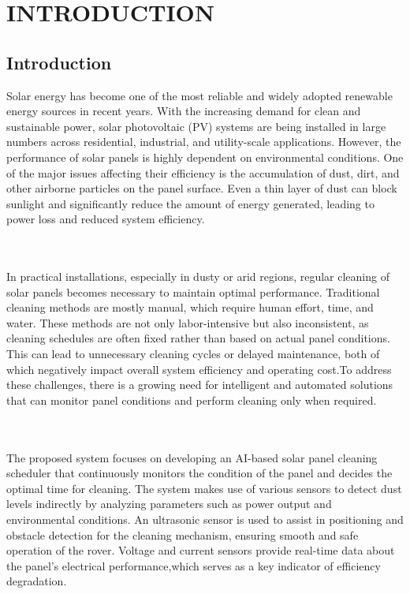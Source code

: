 \documentclass[10pt]{report}
\begin{document}
\begin{sloppypar}
{{{\begin{sloppypar}
\chapter{INTRODUCTION}
\section{Introduction}
\hspace{0.5cm} 
Solar energy has become one of the most reliable and widely adopted renewable energy sources in recent years. With the increasing demand for clean and sustainable power, solar photovoltaic (PV) systems are being installed in large numbers across
residential, industrial, and utility-scale applications. However, the performance of solar panels is highly dependent on environmental conditions. One of the major issues affecting their efficiency is the accumulation of dust, dirt, and other airborne particles on the panel surface. Even a thin layer of dust can block sunlight and significantly reduce the amount of energy generated, leading to power loss and reduced
system efficiency.

\\
\\
\hspace{0.5cm}
In practical installations, especially in dusty or arid regions, regular cleaning of solar panels becomes necessary to maintain optimal performance. Traditional cleaning methods are mostly manual, which require human effort, time, and water. These methods are not only labor-intensive but also inconsistent, as cleaning schedules are often fixed rather than based on actual panel conditions. This can lead to unnecessary cleaning cycles or delayed maintenance, both of which negatively impact overall
system efficiency and operating cost.To address these challenges, there is a growing need for intelligent and automated solutions that can monitor panel conditions and perform cleaning only when required. 

\\
\\
\hspace{0.5cm}
The proposed system focuses on developing an AI-based solar panel cleaning
scheduler that continuously monitors the condition of the panel and decides the optimal time for cleaning. The system makes use of various sensors to detect dust levels indirectly by analyzing parameters such as power output and environmental conditions. An ultrasonic sensor is used to assist in positioning and obstacle detection for the cleaning mechanism, ensuring smooth and safe operation of the rover. Voltage and current sensors provide real-time data about the panel’s electrical performance,which serves as a key indicator of efficiency degradation.


\end{sloppypar}}}}
\end{sloppypar}
\end{document}
